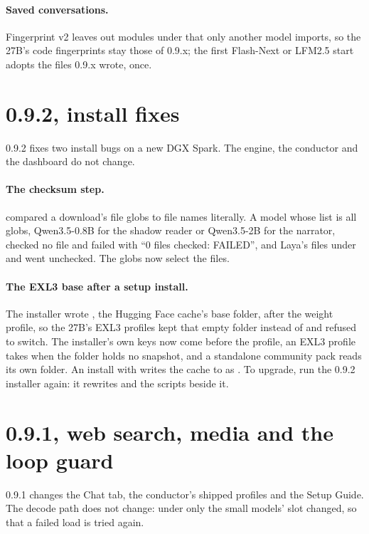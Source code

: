 \paragraph{Saved conversations.} Fingerprint v2 leaves out modules under  that only another model imports, so the 27B's code fingerprints stay those of 0.9.x; the first Flash-Next or LFM2.5 start adopts the files 0.9.x wrote, once.

\section{0.9.2, install fixes}\label{sec:changelog-092}

0.9.2 fixes two install bugs on a new DGX Spark. The engine, the conductor and the dashboard do not change.

\paragraph{The checksum step.}  compared a download's file globs to file names literally. A model whose list is all globs, Qwen3.5-0.8B for the shadow reader or Qwen3.5-2B for the narrator, checked no file and failed with \enquote{0 files checked: FAILED}, and Laya's files under  and  went unchecked. The globs now select the files.

\paragraph{The EXL3 base after a setup install.} The installer wrote , the Hugging Face cache's base folder, after the weight profile, so the 27B's EXL3 profiles kept that empty folder instead of  and  refused to switch. The installer's own keys now come before the profile, an EXL3 profile takes  when the folder holds no snapshot, and a standalone community pack reads its own folder. An install with  writes the cache to  as . To upgrade, run the 0.9.2 installer again: it rewrites  and the scripts beside it.

\section{0.9.1, web search, media and the loop guard}\label{sec:changelog-091}

0.9.1 changes the Chat tab, the conductor's shipped profiles and the Setup Guide. The decode path does not change: under  only the small models' slot changed, so that a failed load is tried again.

